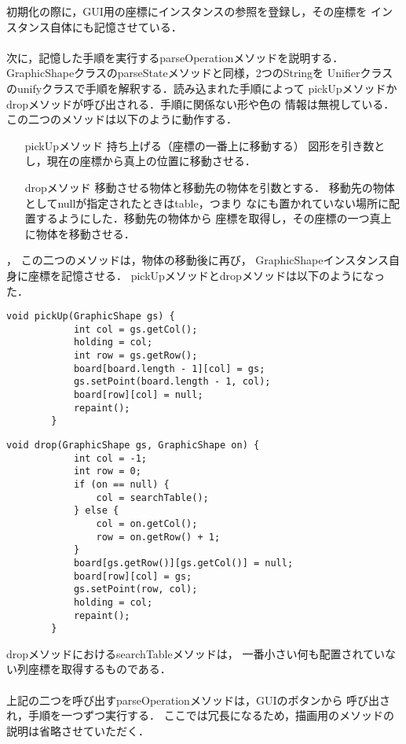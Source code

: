 \documentclass{jarticle}
\begin{document}
    初期化の際に，GUI用の座標にインスタンスの参照を登録し，その座標を
    インスタンス自体にも記憶させている．\\ \\
    次に，記憶した手順を実行するparseOperationメソッドを説明する．
    GraphicShapeクラスのparseStateメソッドと同様，2つのStringを
    Unifierクラスのunifyクラスで手順を解釈する．読み込まれた手順によって
    pickUpメソッドかdropメソッドが呼び出される．手順に関係ない形や色の
    情報は無視している．この二つのメソッドは以下のように動作する．
    \begin{itemize}
        \item[pickUpメソッド] 持ち上げる（座標の一番上に移動する）
            図形を引き数とし，現在の座標から真上の位置に移動させる．
        \item[dropメソッド] 移動させる物体と移動先の物体を引数とする．
            移動先の物体としてnullが指定されたときはtable，つまり
            なにも置かれていない場所に配置するようにした．移動先の物体から
            座標を取得し，その座標の一つ真上に物体を移動させる．
    \end{itemize}，
    この二つのメソッドは，物体の移動後に再び，
    GraphicShapeインスタンス自身に座標を記憶させる．
    pickUpメソッドとdropメソッドは以下のようになった．
    \begin{lstlisting}[caption=pickUpメソッド]
        void pickUp(GraphicShape gs) {
            int col = gs.getCol();
            holding = col;
            int row = gs.getRow();
            board[board.length - 1][col] = gs;
            gs.setPoint(board.length - 1, col);
            board[row][col] = null;
            repaint();
        }
    \end{lstlisting}
    \begin{lstlisting}[caption=dropメソッド]
        void drop(GraphicShape gs, GraphicShape on) {
            int col = -1;
            int row = 0;
            if (on == null) {
                col = searchTable();
            } else {
                col = on.getCol();
                row = on.getRow() + 1;
            }
            board[gs.getRow()][gs.getCol()] = null;
            board[row][col] = gs;
            gs.setPoint(row, col);
            holding = col;
            repaint();
        }
    \end{lstlisting}
    dropメソッドにおけるsearchTableメソッドは，
    一番小さい何も配置されていない列座標を取得するものである．\\ \\
    上記の二つを呼び出すparseOperationメソッドは，GUIのボタンから
    呼び出され，手順を一つずつ実行する．
    ここでは冗長になるため，描画用のメソッドの説明は省略させていただく．
\end{document}
